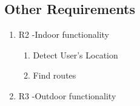 \documentclass[a4paper, 12pt, one column, aas_macros]{article}
\begin{document}
\subsection{Other Requirements}
\begin{enumerate}

\item R2 -Indoor functionality
\begin{enumerate}
\item Detect User's Location
\item Find  routes
\end{enumerate}

\item R3 -Outdoor functionality


\end{enumerate}




\newpage
\end{document}

